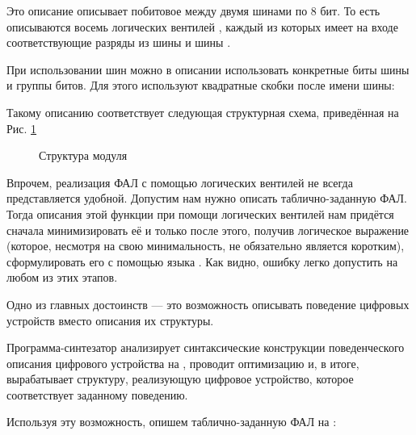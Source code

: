 

\par{Это описание описывает побитовое  между двумя шинами по 8 бит. То есть описываются восемь логических вентилей , каждый из которых имеет на входе соответствующие разряды из шины \emph{} и шины \emph{}.}

\par{При использовании шин можно в описании использовать конкретные биты шины и группы битов. Для этого используют квадратные скобки после имени шины:}



\par{Такому описанию соответствует следующая структурная схема, приведённая на Рис. \ref{fig:bitwiseops}}

\begin{figure}[H]
  \centering
  \def\svgwidth{\columnwidth}
  
  \caption{Структура модуля }
  \label{fig:bitwiseops}
\end{figure}

\par{Впрочем, реализация ФАЛ с помощью логических вентилей не всегда представляется удобной. Допустим нам нужно описать таблично-заданную ФАЛ. Тогда описания этой функции при помощи логических вентилей нам придётся сначала минимизировать её и только после этого, получив логическое выражение (которое, несмотря на свою минимальность, не обязательно является коротким), сформулировать его с помощью языка . Как видно, ошибку легко допустить на любом из этих этапов.}

\par{Одно из главных достоинств  — это возможность описывать поведение цифровых устройств вместо описания их структуры.}

\par{Программа-синтезатор анализирует синтаксические конструкции поведенческого описания цифрового устройства на , проводит оптимизацию и, в итоге, вырабатывает структуру, реализующую цифровое устройство, которое соответствует заданному поведению.}

\par{Используя эту возможность, опишем таблично-заданную ФАЛ на :}

